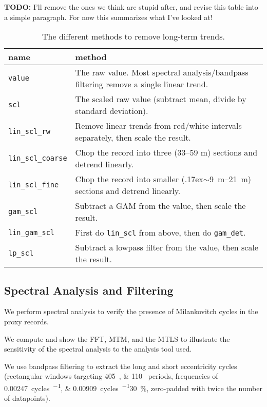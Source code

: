 \documentclass[draft]{agujournal2019}
\newcommand{\appr}{\raise.17ex\hbox{$\scriptstyle\sim$}} %
\begin{document}
\textbf{TODO:} I'll remove the ones we think are stupid after, and revise this table into a simple paragraph. For now this summarizes what I've looked at!

\begin{table}[htbp]
  \caption{\label{tab:detrend_types}
    The different methods to remove long-term trends.}
\centering
\begin{tabular}{ll}
  name & method\\
  \hline
  \texttt{value} & The raw value. Most spectral analysis/bandpass filtering remove a single linear trend.\\
  \texttt{scl} & The scaled raw value (subtract mean, divide by standard deviation). \\
  \texttt{lin\_scl\_rw} & Remove linear trends from red/white intervals separately, then scale the result.\\ %
  \texttt{lin\_scl\_coarse} & Chop the record into three (33--59 m) sections and detrend linearly.\\
  \texttt{lin\_scl\_fine} & Chop the record into smaller (\appr\qtyrange{9}{21}{\metre}) sections and detrend linearly.\\
  \texttt{gam\_scl} & Subtract a \gls{GAM} from the value, then scale the result.\\
  \texttt{lin\_gam\_scl} & First do \texttt{lin\_scl} from above, then do \texttt{gam\_det}.\\ %
  \texttt{lp\_scl} & Subtract a lowpass filter from the value, then scale the result.\\
\end{tabular}
\end{table}

\subsection{Spectral Analysis and Filtering}\label{sec:spectral}

We perform spectral analysis to verify the presence of Milankovitch cycles in the proxy records.

We compute and show the \gls{FFT}, %
\gls{MTM}, and the \gls{MTLS} to illustrate the sensitivity of the spectral analysis to the analysis tool used.

We use bandpass filtering to extract the long and short eccentricity cycles (rectangular windows targeting \qtylist{405;110}{\kiloyear} periods, frequencies of \qtylist{0.00247;0.00909}{cycles\per\kiloyear}\textpm\qty{30}{\percent}, zero-padded with twice the number of datapoints).
\end{document}
